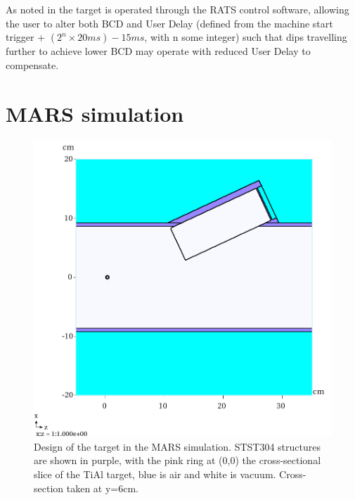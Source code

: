 \documentclass[a4paper,11pt]{article}
\begin{document}
As noted in \cite{micenote480} the target is operated through the RATS control software, allowing the user to alter both BCD and User Delay (defined from the machine start trigger + $(2^{n}\times20ms)-15ms$, with n some integer) such that dips travelling further to achieve lower BCD may operate with reduced User Delay to compensate. 

\pagebreak
\pagebreak
\newpage
\newpage

\section{MARS simulation}

\begin{figure}[b!]
  \begin{center}
    \includegraphics[width=0.7\columnwidth]{./figures/XZGeom-v6-Q1-y=6cm-Zoom.png}
    \caption{Design of the target in the MARS simulation. STST304 structures are shown in purple, with the pink ring at (0,0) the cross-sectional slice of the TiAl target, blue is air and white is vacuum. Cross-section taken at y=6cm.}
    \label{fig:MARSwindow}
  \end{center}
\end{figure}
\end{document}
